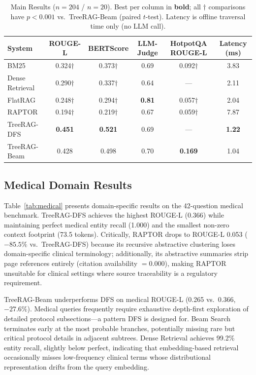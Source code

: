 \documentclass[sigconf,review,anonymous]{acmart}
\begin{document}
\begin{table}[t]
\caption{Main Results ($n=204$ / $n=20$). Best per column in \textbf{bold};
all $\dagger$ comparisons have $p<0.001$ vs.\ TreeRAG-Beam (paired $t$-test).
Latency is offline traversal time only (no LLM call).}
\label{tab:main}
\begin{tabular}{lccccc}
\toprule
System & ROUGE-L & BERTScore & LLM-Judge & HotpotQA ROUGE-L & Latency (ms) \\
\midrule
BM25 & 0.324$\dagger$ & 0.373$\dagger$ & 0.69 & 0.092$\dagger$ & 3.83 \\
Dense Retrieval & 0.290$\dagger$ & 0.337$\dagger$ & 0.64 & --- & 2.11 \\
FlatRAG & 0.248$\dagger$ & 0.294$\dagger$ & \textbf{0.81} & 0.057$\dagger$ & 2.04 \\
RAPTOR & 0.194$\dagger$ & 0.219$\dagger$ & 0.67 & 0.059$\dagger$ & 7.87 \\
TreeRAG-DFS & \textbf{0.451} & \textbf{0.521} & 0.69 & --- & \textbf{1.22} \\
TreeRAG-Beam & 0.428 & 0.498 & 0.70 & \textbf{0.169} & 1.04 \\
\bottomrule
\end{tabular}
\end{table}

\subsection{Medical Domain Results}
\label{sec:medical}
Table~\ref{tab:medical} presents domain-specific results on the 42-question
medical benchmark. TreeRAG-DFS achieves the highest ROUGE-L (0.366) while
maintaining perfect medical entity recall (1.000) and the smallest non-zero
context footprint (73.5 tokens). Critically, RAPTOR drops to ROUGE-L 0.053
($-85.5\%$ vs.\ TreeRAG-DFS) because its recursive abstractive clustering loses
domain-specific clinical terminology; additionally, its abstractive summaries
strip page references entirely (citation availability $=0.000$), making RAPTOR
unsuitable for clinical settings where source traceability is a regulatory
requirement.

TreeRAG-Beam underperforms DFS on medical ROUGE-L (0.265 vs.\ 0.366, $-27.6\%$).
Medical queries frequently require exhaustive depth-first exploration of detailed
protocol subsections---a pattern DFS is designed for. Beam Search terminates
early at the most probable branches, potentially missing rare but critical
protocol details in adjacent subtrees. Dense Retrieval achieves 99.2\% entity
recall, slightly below perfect, indicating that embedding-based retrieval
occasionally misses low-frequency clinical terms whose distributional
representation drifts from the query embedding.
\end{document}

